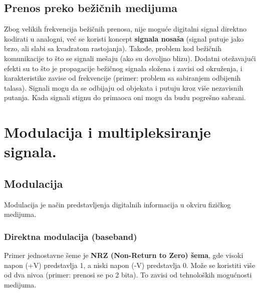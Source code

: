 \documentclass[a4paper]{article}
\begin{document}
    \subsection{Prenos preko bežičnih medijuma}
        Zbog velikih frekvencija bežičnih prenosa, nije moguće digitalni signal direktno kodirati
        u analogni, već se koristi koncept \textbf{signala nosaša} (signal putuje jako brzo, ali
        slabi sa kvadratom rastojanja). Takođe, problem kod bežičnih komunikacije to što se signali
        mešaju (ako su dovoljno blizu). Dodatni otežavajući efekti su to što je propagacije bežičnog
        signala složena i zavisi od okruženja, i karakteristike zavise od frekvencije (primer: problem
        sa sabiranjem odbijenih talasa). Signali mogu da se odbijaju od objekata i putuju kroz više 
        nezavisnih putanja. Kada signali stignu do primaoca oni mogu da budu pogrešno sabrani.

\section{Modulacija i multipleksiranje signala. }
    \subsection{Modulacija}
        Modulacija je način predstavljenja digitalnih informacija u okviru fizičkog medijuma.
        \subsubsection{Direktna modulacija (baseband)}
        Primer jednostavne šeme je \textbf{NRZ (Non-Return to Zero) šema}, gde visoki napon (+V) predstavlja 1, 
        a niski napon (-V) predstavlja 0. Može se koristiti više od dva nivoa (primer: prenosi se po
        2 bita). To zavisi od tehnoloških mogućnosti medijuma.\\
\end{document}
